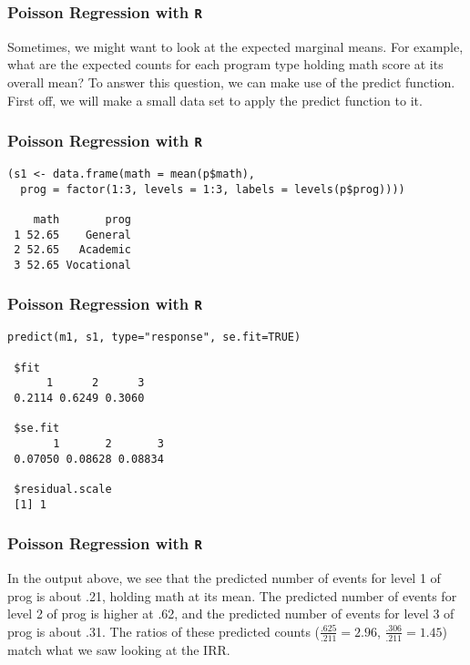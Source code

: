 \documentclass[00-GLMregslides.tex]{subfiles}
\begin{document}
\begin{frame}[fragile]

\frametitle{Poisson Regression with \texttt{R}}
\Large
Sometimes, we might want to look at the expected marginal means. For example, what are the expected counts for each program type holding math score at its overall mean? To answer this question, we can make use of the predict function. First off, we will make a small data set to apply the predict function to it.


\end{frame}

\begin{frame}[fragile]

\frametitle{Poisson Regression with \texttt{R}}
\Large

\begin{framed}
\begin{verbatim}
(s1 <- data.frame(math = mean(p$math),
  prog = factor(1:3, levels = 1:3, labels = levels(p$prog))))
 
    math       prog
 1 52.65    General
 2 52.65   Academic
 3 52.65 Vocational
\end{verbatim}
\end{framed}
\end{frame}

\begin{frame}[fragile]

\frametitle{Poisson Regression with \texttt{R}}
\Large 

\begin{framed}
\begin{verbatim}
predict(m1, s1, type="response", se.fit=TRUE)
 
 $fit
      1      2      3 
 0.2114 0.6249 0.3060 
 
 $se.fit
       1       2       3 
 0.07050 0.08628 0.08834 
 
 $residual.scale
 [1] 1
\end{verbatim}
\end{framed}
\end{frame}

\begin{frame}[fragile]

\frametitle{Poisson Regression with \texttt{R}}
\Large 
In the output above, we see that the predicted number of events for level 1 of prog is about .21, holding math at its mean. The predicted number of events for level 2 of prog is higher at .62, and the predicted number of events for level 3 of prog is about .31. The ratios of these predicted counts (\(\frac{.625}{.211} = 2.96\), \(\frac{.306}{.211} = 1.45\)) match what we saw looking at the IRR.

\end{frame}
\end{document}
